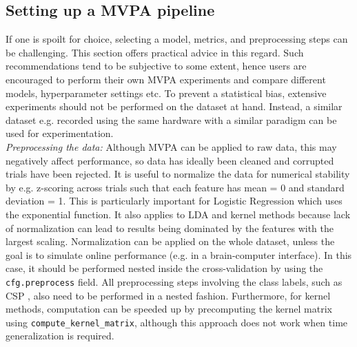 \documentclass[utf8]{frontiersSCNS} %
\newcommand{\ttt}[1]{\texttt{#1}}
\begin{document}

\subsection{Setting up a MVPA pipeline}

If one is spoilt for choice, selecting  a model, metrics, and preprocessing steps can be challenging. This section offers practical advice in this regard. Such recommendations tend to be subjective to some extent, hence users are encouraged to perform their own MVPA experiments and compare different models, hyperparameter settings etc. To prevent a statistical bias, extensive experiments should not be performed on the dataset at hand. Instead, a similar dataset e.g. recorded using the same hardware with a similar paradigm can be used for experimentation.\\

\textit{Preprocessing the data:} Although MVPA can be applied to raw data, this may negatively affect performance, so data has ideally been cleaned and corrupted trials have been rejected. It is useful to normalize the data for numerical stability by e.g. z-scoring across trials such that each feature has mean = 0 and standard deviation = 1. This is particularly important for Logistic Regression which uses the exponential function. It also applies to LDA and kernel methods because lack of normalization can lead to results being dominated by the features with the largest scaling. Normalization can be applied on the whole dataset, unless the goal is to simulate online performance (e.g. in a brain-computer interface). In this case, it should be performed nested inside the cross-validation by using the \ttt{cfg.preprocess} field. All preprocessing steps involving the class labels, such as CSP \citep{Blankertz2008a}, also need to be performed in a nested fashion. Furthermore, for kernel methods, computation can be speeded up by precomputing the kernel matrix using \ttt{compute\_kernel\_matrix}, although this approach does not work when time generalization is required.
\end{document}
